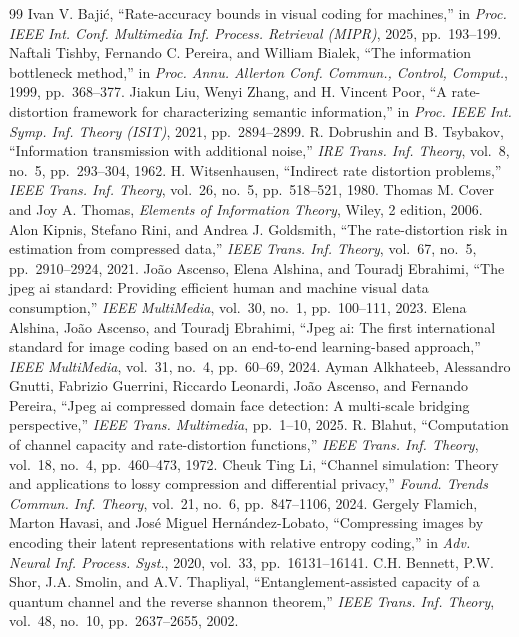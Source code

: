 \begin{thebibliography}{99}
 Ivan V. Bajić, ``Rate-accuracy bounds in visual coding for machines,'' in \emph{Proc. IEEE Int. Conf. Multimedia Inf. Process. Retrieval (MIPR)}, 2025, pp.~193--199.
 Naftali Tishby, Fernando C. Pereira, and William Bialek, ``The information bottleneck method,'' in \emph{Proc. Annu. Allerton Conf. Commun., Control, Comput.}, 1999, pp.~368--377.
 Jiakun Liu, Wenyi Zhang, and H. Vincent Poor, ``A rate-distortion framework for characterizing semantic information,'' in \emph{Proc. IEEE Int. Symp. Inf. Theory (ISIT)}, 2021, pp.~2894--2899.
 R. Dobrushin and B. Tsybakov, ``Information transmission with additional noise,'' \emph{IRE Trans. Inf. Theory}, vol.~8, no.~5, pp.~293--304, 1962.
 H. Witsenhausen, ``Indirect rate distortion problems,'' \emph{IEEE Trans. Inf. Theory}, vol.~26, no.~5, pp.~518--521, 1980.
 Thomas M. Cover and Joy A. Thomas, \emph{Elements of Information Theory}, Wiley, 2 edition, 2006.
 Alon Kipnis, Stefano Rini, and Andrea J. Goldsmith, ``The rate-distortion risk in estimation from compressed data,'' \emph{IEEE Trans. Inf. Theory}, vol.~67, no.~5, pp.~2910--2924, 2021.
 João Ascenso, Elena Alshina, and Touradj Ebrahimi, ``The jpeg ai standard: Providing efficient human and machine visual data consumption,'' \emph{IEEE MultiMedia}, vol.~30, no.~1, pp.~100--111, 2023.
 Elena Alshina, João Ascenso, and Touradj Ebrahimi, ``Jpeg ai: The first international standard for image coding based on an end-to-end learning-based approach,'' \emph{IEEE MultiMedia}, vol.~31, no.~4, pp.~60--69, 2024.
 Ayman Alkhateeb, Alessandro Gnutti, Fabrizio Guerrini, Riccardo Leonardi, João Ascenso, and Fernando Pereira, ``Jpeg ai compressed domain face detection: A multi-scale bridging perspective,'' \emph{IEEE Trans. Multimedia}, pp.~1--10, 2025.
 R. Blahut, ``Computation of channel capacity and rate-distortion functions,'' \emph{IEEE Trans. Inf. Theory}, vol.~18, no.~4, pp.~460--473, 1972.
 Cheuk Ting Li, ``Channel simulation: Theory and applications to lossy compression and differential privacy,'' \emph{Found. Trends Commun. Inf. Theory}, vol.~21, no.~6, pp.~847--1106, 2024.
 Gergely Flamich, Marton Havasi, and José Miguel Hernández-Lobato, ``Compressing images by encoding their latent representations with relative entropy coding,'' in \emph{Adv. Neural Inf. Process. Syst.}, 2020, vol.~33, pp.~16131--16141.
 C.H. Bennett, P.W. Shor, J.A. Smolin, and A.V. Thapliyal, ``Entanglement-assisted capacity of a quantum channel and the reverse shannon theorem,'' \emph{IEEE Trans. Inf. Theory}, vol.~48, no.~10, pp.~2637--2655, 2002.

\end{thebibliography}

